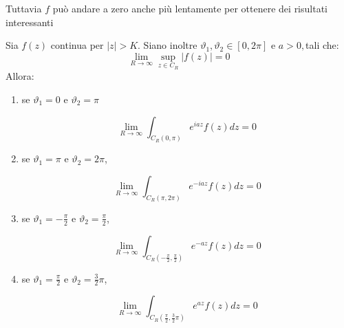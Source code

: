Tuttavia $f$ può andare a zero anche più lentamente per ottenere dei risultati interessanti
\begin{thm}
Sia $f(z)$ continua per $|z| > K.$ Siano inoltre $\vartheta_{1}, \vartheta_{2} \in [0, 2\pi]$ e $a > 0, $tali che:
\begin{equation*}
\lim_{R\rightarrow \infty}\sup_{z\in C_{R}}| f(z)| = 0
\end{equation*}
Allora:
\begin{enumerate}
\item se $\vartheta_{1} = 0$ e $\vartheta_{2} = \pi $

\begin{equation*}
\lim_{R\rightarrow \infty}\int_{C_{R} (0, \pi)} e^{iaz} f(z)dz = 0
\end{equation*}
\item se $\vartheta_{1} = \pi $ e $\vartheta_{2} = 2\pi $,

\begin{equation*}
\lim_{R\rightarrow \infty}\int_{C_{R} (\pi, 2\pi)} e^{- iaz} f(z)dz = 0
\end{equation*}
\item se $\vartheta_{1} = - \frac{\pi}{2}$ e $\vartheta_{2} = \frac{\pi}{2}$,

\begin{equation*}
\lim_{R\rightarrow \infty}\int_{C_{R}\left(- \frac{\pi}{2}, \frac{\pi}{2}\right)} e^{- az} f(z)dz = 0
\end{equation*}
\item se $\vartheta_{1} = \frac{\pi}{2}$ e $\vartheta_{2} = \frac{3}{2} \pi $,

\begin{equation*}
\lim_{R\rightarrow \infty}\int_{C_{R}\left(\frac{\pi}{2}, \frac{3}{2} \pi \right)} e^{az} f(z)dz = 0
\end{equation*}
\end{enumerate}
\end{thm}
